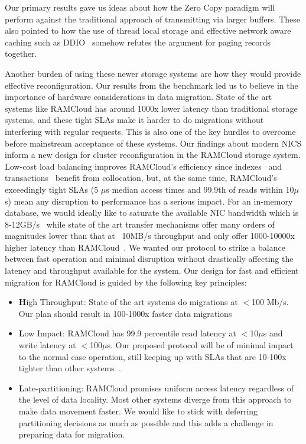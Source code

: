 Our primary results gave us ideas about how the Zero Copy paradigm will perform against
the traditional approach of transmitting via larger buffers. These also pointed 
to how the use of thread local storage and effective network aware caching such as DDIO~\cite{ddio}
somehow refutes the argument for paging records together.

Another burden of using these newer storage systems are how they would provide effective 
reconfiguration. Our results from the benchmark led us to believe in the importance of 
hardware considerations in data migration. State of the art systems like RAMCloud has around 1000x
lower latency than traditional storage systems, and these tight SLAs make it harder to do migrations
without interfering with regular requests. This is also one of the key hurdles 
to overcome before mainstream acceptance of these systems.
Our findings about modern NICS inform a new design for cluster reconfiguration
in the RAMCloud storage system. Low-cost load balancing improves RAMCloud’s
efficiency since indexes~\cite{slik} and transactions~\cite{ramcloudtx} benefit from collocation, but, at the same time, RAMCloud’s exceedingly tight SLAs (5 $\mu$s median
access times and 99.9th of reads within 10$\mu$s) mean any disruption to performance
has a serious impact. For an in-memory database, we would ideally like to saturate the
available NIC bandwidth which is 8-12GB/s~\cite{cx3,cx4} while state of the art 
transfer mechanisms offer many orders of magnitudes lower than that at ~10MB/s 
throughput and only offer 1000-10000x higher latency than RAMCloud~\cite{ramcloud}.
We wanted our protocol to strike a balance between fast operation and minimal disruption without drastically affecting
the latency and throughput available for the system. Our design for fast and efficient migration
for RAMCloud is guided by the following key principles:
\begin{itemize}
\item{\textbf High Throughput}: State of the art systems do migrations at $<$100 Mb/s. Our plan
should result in 100-1000x faster data migrations
\item{\textbf Low Impact}: RAMCloud has 99.9 percentile read latency at $<$10$\mu$s and write latency
at $<$100$\mu$s. Our proposed protocol will be of minimal impact to the normal case operation, still keeping
up with SLAs that are 10-100x tighter than other systems~\cite{squall}.
\item{\textbf Late-partitioning}: RAMCloud promises uniform access latency regardless of the level of data locality.
Most other systems diverge from this approach to make data movement faster. We would like to stick with
deferring partitioning decisions as much as possible and this adds a challenge in preparing data for migration.
\end{itemize}


